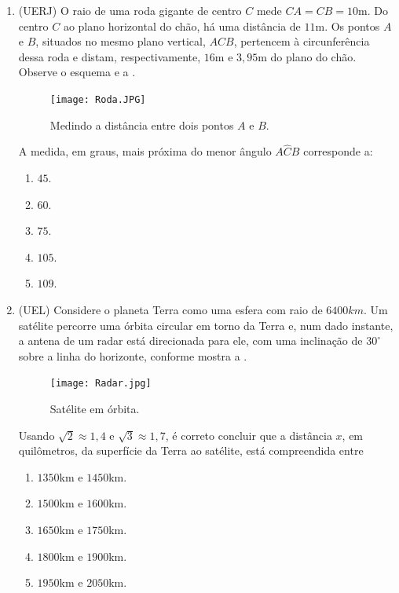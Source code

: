 \begin{enumerate}
\item{}
(UERJ) O raio de uma roda gigante de centro $C$ mede $CA = CB = 10$m. Do centro $C$ ao plano horizontal do chão, há uma distância de $11$m. Os pontos $A$ e $B$, situados no mesmo plano vertical, $ACB$, pertencem à circunferência dessa roda e distam, respectivamente, $16$m e $3,95$m do plano do chão. Observe o esquema e a .
\begin{figure}[H]
    \centering
    \texttt{[image: Roda.JPG]}
    \caption{Medindo a distância entre dois pontos $A$ e $B$.}
    \label{Roda}
\end{figure}
A medida, em graus, mais próxima do menor ângulo $A\hat{C}B$ corresponde a: 
\begin{enumerate}
    \item $45$.
    \item $60$.
    \item $75$.
    \item $105$.
    \item $109$.
\end{enumerate} 

\item{}
(UEL) Considere o planeta Terra como uma esfera com raio de $6400 km$. Um satélite percorre uma órbita circular em torno da Terra e, num dado instante, a antena de um radar está direcionada para ele, com uma inclinação de $30^\circ$ sobre a linha do horizonte, conforme mostra a . 
\begin{figure}[H]
    \centering
    \texttt{[image: Radar.jpg]}
    \caption{Satélite em órbita.}
    \label{Radar}
\end{figure}
Usando  $\sqrt{2} \approx 1,4$ e $\sqrt{3} \approx 1,7$, é correto concluir que a distância $x$, em quilômetros, da superfície da Terra ao satélite, está compreendida entre

\begin{enumerate}
    \item $1350$km e $1450$km.
    \item $1500$km e $1600$km.
    \item $1650$km e $1750$km.
    \item $1800$km e $1900$km.
    \item $1950$km e $2050$km.
\end{enumerate} 


\end{enumerate}

